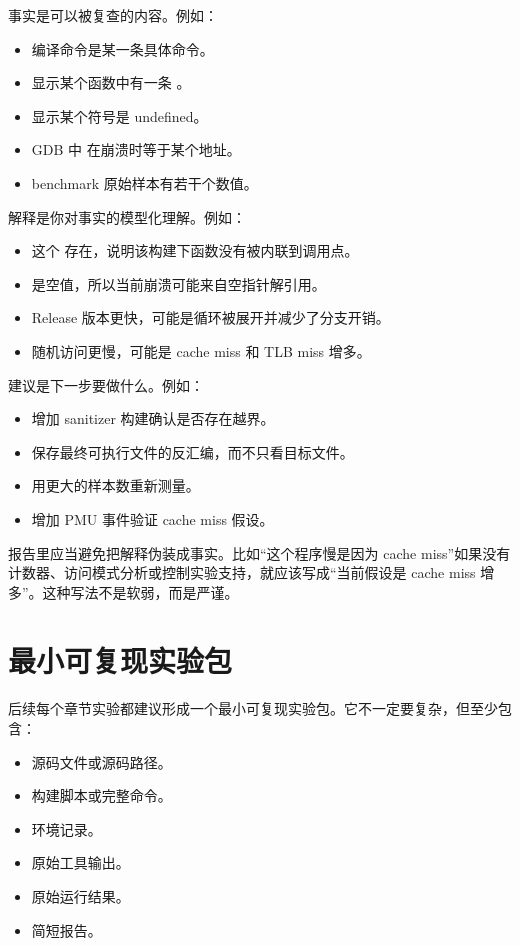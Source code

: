 事实是可以被复查的内容。例如：

\begin{itemize}
  \item 编译命令是某一条具体命令。
  \item {} 显示某个函数中有一条 。
  \item {} 显示某个符号是 undefined。
  \item GDB 中  在崩溃时等于某个地址。
  \item benchmark 原始样本有若干个数值。
\end{itemize}

解释是你对事实的模型化理解。例如：

\begin{itemize}
  \item 这个  存在，说明该构建下函数没有被内联到调用点。
  \item {} 是空值，所以当前崩溃可能来自空指针解引用。
  \item Release 版本更快，可能是循环被展开并减少了分支开销。
  \item 随机访问更慢，可能是 cache miss 和 TLB miss 增多。
\end{itemize}

建议是下一步要做什么。例如：

\begin{itemize}
  \item 增加 sanitizer 构建确认是否存在越界。
  \item 保存最终可执行文件的反汇编，而不只看目标文件。
  \item 用更大的样本数重新测量。
  \item 增加 PMU 事件验证 cache miss 假设。
\end{itemize}

报告里应当避免把解释伪装成事实。比如“这个程序慢是因为 cache miss”如果没有计数器、访问模式分析或控制实验支持，就应该写成“当前假设是 cache miss 增多”。这种写法不是软弱，而是严谨。

\section{最小可复现实验包}

后续每个章节实验都建议形成一个最小可复现实验包。它不一定要复杂，但至少包含：

\begin{itemize}
  \item 源码文件或源码路径。
  \item 构建脚本或完整命令。
  \item 环境记录。
  \item 原始工具输出。
  \item 原始运行结果。
  \item 简短报告。
\end{itemize}

